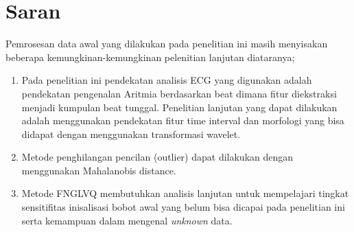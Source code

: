 \section{Saran}
Pemrosesan data awal yang dilakukan pada penelitian ini masih menyisakan
beberapa kemungkinan-kemungkinan pelenitian lanjutan diataranya;
\begin{enumerate}
  \item Pada penelitian ini pendekatan analisis ECG yang digunakan adalah
  pendekatan pengenalan Aritmia berdasarkan beat dimana fitur
  diekstraksi menjadi kumpulan beat tunggal. Penelitian lanjutan yang dapat
  dilakukan adalah menggunakan pendekatan fitur time interval dan
  morfologi yang bisa didapat dengan menggunakan transformasi
  wavelet.
  \item Metode penghilangan pencilan (outlier) dapat dilakukan dengan
  menggunakan Mahalanobis distance.
  \item Metode FNGLVQ membutuhkan analisis lanjutan untuk mempelajari tingkat
  sensitifitas inisalisasi bobot awal yang belum bisa dicapai pada penelitian
  ini serta kemampuan dalam mengenal \emph{unknown} data.
\end{enumerate}
